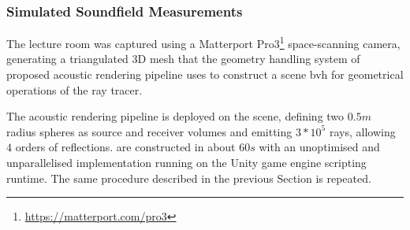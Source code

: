 \subsubsection{Simulated Soundfield Measurements}
The lecture room was captured using a Matterport Pro3\footnote{\url{https://matterport.com/pro3}} space-scanning camera, generating a triangulated 3D mesh that the geometry handling system of proposed acoustic rendering pipeline uses to construct a scene \acrshort{bvh} for geometrical operations of the ray tracer.\par
The acoustic rendering pipeline is deployed on the scene, defining two $0.5m$ radius spheres as source and receiver volumes and emitting $3*10^5$ rays, allowing $4$ orders of reflections.  are constructed in about $60s$ with an unoptimised and unparallelised implementation running on the Unity game engine scripting runtime. The same procedure described in the previous Section is repeated. \par

